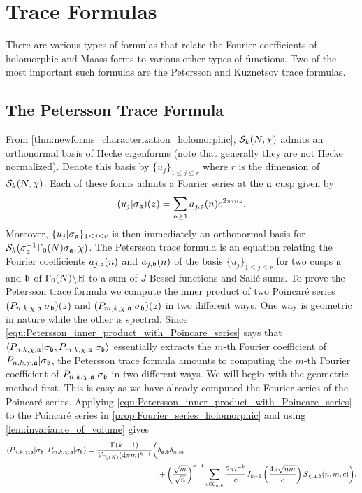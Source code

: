 \chapter{Trace Formulas}
  There are various types of formulas that relate the Fourier coefficients of holomorphic and Maass forms to various other types of functions. Two of the most important such formulas are the Petersson and Kuznetsov trace formulas.
  \section{The Petersson Trace Formula}
    From \cref{thm:newforms_characterization_holomorphic}, $\mathcal{S}_{k}(N,\chi)$ admits an orthonormal basis of Hecke eigenforms (note that generally they are not Hecke normalized). Denote this basis by $\{u_{j}\}_{1 \le j \le r}$ where $r$ is the dimension of $\mathcal{S}_{k}(N,\chi)$. Each of these forms admits a Fourier series at the $\mathfrak{a}$ cusp given by
    \[
      (u_{j}|\sigma_{\mathfrak{a}})(z) = \sum_{n \ge 1}a_{j,\mathfrak{a}}(n)e^{2\pi inz}.
    \]
    Moreover, $\{u_{j}|\sigma_{\mathfrak{a}}\}_{1 \le j \le r}$ is then immediately an orthonormal basis for $\mathcal{S}_{k}(\sigma_{\mathfrak{a}}^{-1}\Gamma_{0}(N)\sigma_{\mathfrak{a}},\chi)$.
    The Petersson trace formula is an equation relating the Fourier coefficients $a_{j,\mathfrak{a}}(n)$ and $a_{j,\mathfrak{b}}(n)$ of the basis $\{u_{j}\}_{1 \le j \le r}$ for two cusps $\mathfrak{a}$ and $\mathfrak{b}$ of $\Gamma_{0}(N)\backslash\mathbb{H}$ to a sum of $J$-Bessel functions and Sali\'e sums. To prove the Petersson trace formula we compute the inner product of two Poincar\'e series $(P_{n,k,\chi,\mathfrak{a}}|\sigma_{\mathfrak{b}})(z)$ and $(P_{m,k,\chi,\mathfrak{a}}|\sigma_{\mathfrak{b}})(z)$ in two different ways. One way is geometric in nature while the other is spectral. Since \cref{equ:Petersson_inner_product_with_Poincare_series} says that $\langle P_{n,k,\chi,\mathfrak{a}}|\sigma_{\mathfrak{b}},P_{m,k,\chi,\mathfrak{a}}|\sigma_{\mathfrak{b}}\rangle$ essentially extracts the $m$-th Fourier coefficient of $P_{n,k,\chi,\mathfrak{a}}|\sigma_{\mathfrak{b}}$, the Petersson trace formula amounts to computing the $m$-th Fourier coefficient of $P_{n,k,\chi,\mathfrak{a}}|\sigma_{\mathfrak{b}}$ in two different ways. We will begin with the geometric method first. This is easy as we have already computed the Fourier series of the Poincar\'e series. Applying \cref{equ:Petersson_inner_product_with_Poincare_series} to the Poincar\'e series in \cref{prop:Fourier_series_holomorphic} and using \cref{lem:invariance_of_volume} gives
    \begin{align*}
      \langle P_{n,k,\chi,\mathfrak{a}}|\sigma_{\mathfrak{b}},P_{m,k,\chi,\mathfrak{a}}|\sigma_{\mathfrak{b}}\rangle = \frac{\Gamma(k-1)}{V_{\Gamma_{0}(N)}(4\pi m)^{k-1}}\bigg(&\delta_{\mathfrak{a},\mathfrak{b}}\delta_{n,m} \\
      &+\left(\frac{\sqrt{m}}{\sqrt{n}}\right)^{k-1}\sum_{c \in \mathcal{C}_{\mathfrak{a},\mathfrak{b}}}\frac{2\pi i^{-k}}{c}J_{k-1}\left(\frac{4\pi\sqrt{nm}}{c}\right)S_{\chi,\mathfrak{a},\mathfrak{b}}(n,m,c)\bigg).
    \end{align*}
